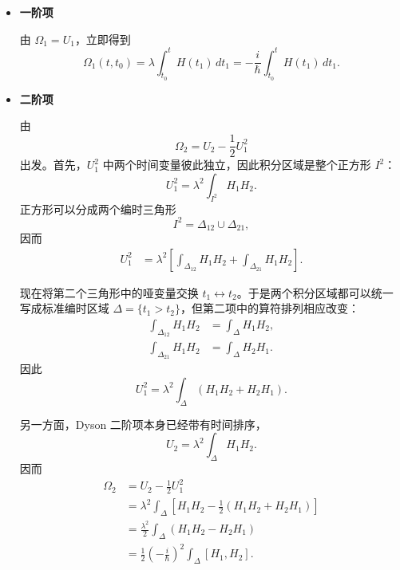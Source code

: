 \documentclass[UTF8,a4paper,11pt,openany]{ctexbook}
\begin{document}
\begin{itemize}
    \item \textbf{一阶项}

    由 $\Omega_1=U_1$，立即得到
    \begin{equation}
        \Omega_1(t,t_0)
        =
        \lambda
        \int_{t_0}^{t}H(t_1)\,dt_1
        =
        -\frac{i}{\hbar}
        \int_{t_0}^{t}H(t_1)\,dt_1.
    \end{equation}

    \item \textbf{二阶项}

    由
    \[
    \Omega_2
    =
    U_2-\frac12U_1^2
    \]
    出发。首先，$U_1^2$ 中两个时间变量彼此独立，因此积分区域是整个正方形 $I^2$：
    \begin{equation}
        U_1^2
        =
        \lambda^2
        \int_{I^2}H_1H_2.
    \end{equation}
    正方形可以分成两个编时三角形
    \[
    I^2
    =
    \Delta_{12}\cup\Delta_{21},
    \]
    因而
    \begin{align}
        U_1^2
        &=
        \lambda^2
        \left[
            \int_{\Delta_{12}}H_1H_2
            +
            \int_{\Delta_{21}}H_1H_2
        \right].
    \end{align}

    现在将第二个三角形中的哑变量交换
    $t_1\leftrightarrow t_2$。于是两个积分区域都可以统一写成标准编时区域
    $\Delta=\{t_1>t_2\}$，但第二项中的算符排列相应改变：
    \begin{align}
        \int_{\Delta_{12}}H_1H_2
        &=
        \int_{\Delta}H_1H_2,
        \nonumber\\
        \int_{\Delta_{21}}H_1H_2
        &=
        \int_{\Delta}H_2H_1.
    \end{align}
    因此
    \begin{equation}
        U_1^2
        =
        \lambda^2
        \int_{\Delta}
        \left(
            H_1H_2+H_2H_1
        \right).
    \end{equation}

    另一方面，Dyson 二阶项本身已经带有时间排序，
    \begin{equation}
        U_2
        =
        \lambda^2
        \int_{\Delta}H_1H_2.
    \end{equation}
    因而
    \begin{align}
        \Omega_2
        &=
        U_2-\frac12U_1^2
        \nonumber\\
        &=
        \lambda^2
        \int_{\Delta}
        \left[
            H_1H_2
            -\frac12
            \left(
                H_1H_2+H_2H_1
            \right)
        \right]
        \nonumber\\
        &=
        \frac{\lambda^2}{2}
        \int_{\Delta}
        \left(
            H_1H_2-H_2H_1
        \right)
        \nonumber\\
        &=
        \frac12
        \left(-\frac{i}{\hbar}\right)^2
        \int_{\Delta}
        [H_1,H_2].
    \end{align}


\end{itemize}
\end{document}
